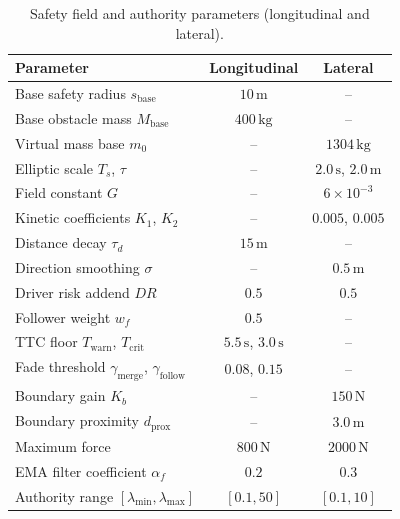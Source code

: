 \documentclass[12pt,a4paper,oneside]{report}
\begin{document}
\begin{table}[H]
\centering
\caption{Safety field and authority parameters (longitudinal and lateral).}
\label{tab:field_params_summary}
\begin{tabular}{lcc}
\hline
\textbf{Parameter} & \textbf{Longitudinal} & \textbf{Lateral} \\
\hline
Base safety radius $s_{\mathrm{base}}$        & $10\,\mathrm{m}$   & --                     \\
Base obstacle mass $M_{\mathrm{base}}$        & $400\,\mathrm{kg}$ & --                     \\
Virtual mass base $m_0$                        & --                 & $1304\,\mathrm{kg}$    \\
Elliptic scale $T_s$, $\tau$                   & --                 & $2.0\,\mathrm{s}$, $2.0\,\mathrm{m}$ \\
Field constant $G$                             & --                 & $6 \times 10^{-3}$    \\
Kinetic coefficients $K_1$, $K_2$              & --                 & $0.005$, $0.005$      \\
Distance decay $\tau_d$                        & $15\,\mathrm{m}$   & --                     \\
Direction smoothing $\sigma$                   & --                 & $0.5\,\mathrm{m}$      \\
Driver risk addend $DR$                        & $0.5$              & $0.5$                  \\
Follower weight $w_f$                          & $0.5$              & --                     \\
TTC floor $T_{\mathrm{warn}}$, $T_{\mathrm{crit}}$ & $5.5\,\mathrm{s}$, $3.0\,\mathrm{s}$ & -- \\
Fade threshold $\gamma_{\mathrm{merge}}$, $\gamma_{\mathrm{follow}}$ & $0.08$, $0.15$ & -- \\
Boundary gain $K_b$                            & --                 & $150\,\mathrm{N}$      \\
Boundary proximity $d_{\mathrm{prox}}$         & --                 & $3.0\,\mathrm{m}$      \\
Maximum force                                  & $800\,\mathrm{N}$  & $2000\,\mathrm{N}$    \\
EMA filter coefficient $\alpha_f$              & $0.2$              & $0.3$                  \\
\hline
Authority range $[\lambda_{\min}, \lambda_{\max}]$ & $[0.1, 50]$     & $[0.1, 10]$          \\

\end{tabular}
\end{table}
\end{document}
